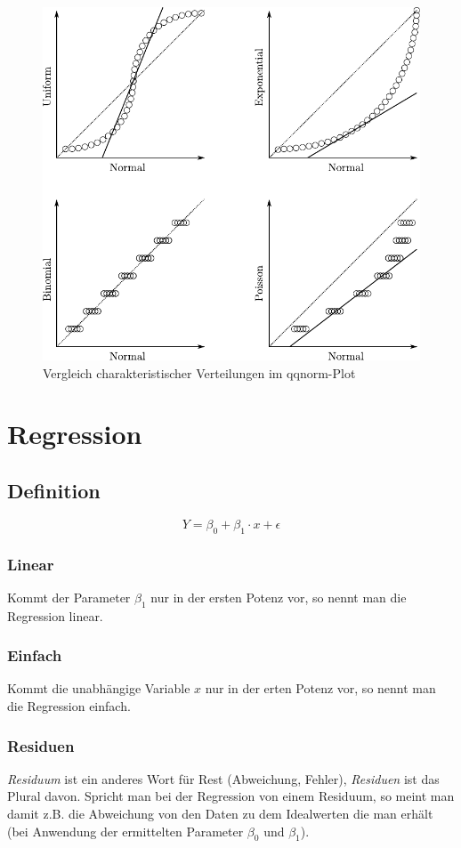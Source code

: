 \begin{figure}[h!]
        \centering
        \includegraphics[scale=\graphscale]{qqnorm-kurven.pdf}
        \caption{Vergleich charakteristischer Verteilungen im qqnorm-Plot}
\end{figure}

\section{Regression}

\subsection{Definition}
\[ Y = \beta_0 + \beta_1 \cdot x + \epsilon \]
\subsubsection{Linear}
Kommt der Parameter $\beta_1$ nur in der ersten Potenz vor, so nennt man die
Regression linear.
\subsubsection{Einfach}
Kommt die unabhängige Variable $x$ nur in der erten Potenz vor, so nennt man 
die Regression einfach.
\subsubsection{Residuen}
\emph{Residuum} ist ein anderes Wort für Rest (Abweichung, Fehler),
\emph{Residuen} ist das Plural davon.
Spricht man bei der Regression von einem Residuum, so meint man damit z.B.
die Abweichung von den Daten zu dem Idealwerten die man erhält (bei Anwendung
der ermittelten Parameter $\beta_0$ und $\beta_1$).

